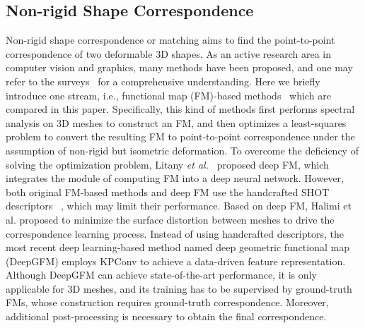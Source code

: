 \documentclass[final]{cvpr}
\begin{document}
\subsection{Non-rigid Shape Correspondence}\label{nonrigidsm}
Non-rigid shape correspondence or matching aims to find the point-to-point correspondence of two deformable 3D shapes. As an active research area in computer vision and graphics, many methods have been proposed, and one may refer to the  surveys~\cite{van2011survey,sahilliouglu2020recent,biasotti2016recent} for a comprehensive understanding. Here we briefly introduce one stream, i.e., functional map (FM)-based methods~\cite{ovsjanikov2012functional} which are compared in this paper. Specifically, this kind of methods first performs spectral analysis on 3D meshes to construct an FM, and then optimizes a least-squares problem to convert the resulting FM to 
point-to-point correspondence under the assumption of non-rigid 
but isometric deformation.
To overcome the deficiency of solving the optimization problem, Litany \textit{et al.}~\cite{litany2017deep} proposed 
deep FM, which integrates the module of computing FM into a deep neural network. However, both original FM-based methods and deep FM use the handcrafted SHOT descriptors~\cite{salti2014shot}
, which may limit their performance. 
Based on deep FM, Halimi et al. \cite{halimi2019unsupervised} proposed to minimize the surface distortion between meshes to drive the correspondence learning process. 
Instead of using handcrafted descriptors, the most recent deep learning-based method named deep geometric functional map (DeepGFM) \cite{donati2020deep} employs KPConv\cite{thomas2019kpconv} to achieve a data-driven feature representation. Although DeepGFM can achieve state-of-the-art performance, it is only applicable for 3D meshes, and its training has to be supervised by ground-truth FMs, whose construction requires ground-truth correspondence. Moreover, additional post-processing is necessary to obtain the final correspondence. 
\end{document}
